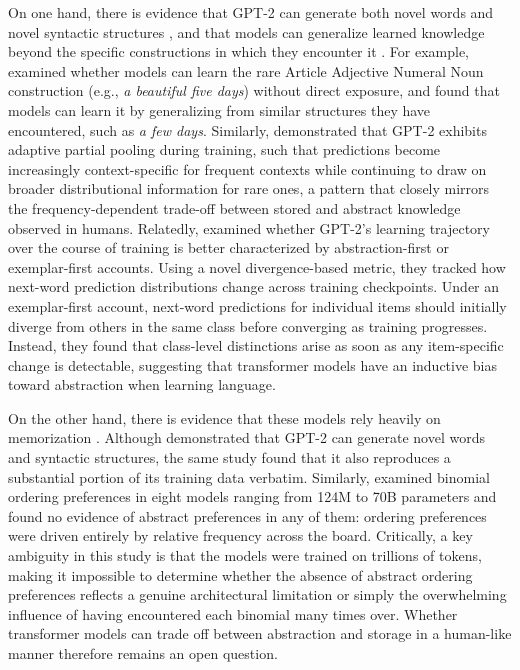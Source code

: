 \documentclass{article}
\begin{document}
On one hand, there is evidence that GPT-2
\citep{radfordLanguageModelsAre2019} can generate both novel words and
novel syntactic structures \citep{mccoy2023howmuchlanguage}, and that
models can generalize learned knowledge beyond the specific
constructions in which they encounter it
\citep{misraLanguageModelsLearn2024}. For example,
\citet{misraLanguageModelsLearn2024} examined whether models can learn
the rare Article Adjective Numeral Noun construction (e.g., \emph{a
beautiful five days}) without direct exposure, and found that models can
learn it by generalizing from similar structures they have encountered,
such as \emph{a few days}. Similarly,
\citet{kapatsinski2026transformersperformadaptive} demonstrated that
GPT-2 exhibits adaptive partial pooling during training, such that
predictions become increasingly context-specific for frequent contexts
while continuing to draw on broader distributional information for rare
ones, a pattern that closely mirrors the frequency-dependent trade-off
between stored and abstract knowledge observed in humans. Relatedly,
\citet{jian2026humans} examined whether GPT-2's learning trajectory over
the course of training is better characterized by abstraction-first or
exemplar-first accounts. Using a novel divergence-based metric, they
tracked how next-word prediction distributions change across training
checkpoints. Under an exemplar-first account, next-word predictions for
individual items should initially diverge from others in the same class
before converging as training progresses. Instead, they found that
class-level distinctions arise as soon as any item-specific change is
detectable, suggesting that transformer models have an inductive bias
toward abstraction when learning language.

On the other hand, there is evidence that these models rely heavily on
memorization
\citep{houghton2025roleabstractrepresentations, mccoy2023howmuchlanguage}.
Although \citet{mccoy2023howmuchlanguage} demonstrated that GPT-2 can
generate novel words and syntactic structures, the same study found that
it also reproduces a substantial portion of its training data verbatim.
Similarly, \citet{houghton2025roleabstractrepresentations} examined
binomial ordering preferences in eight models ranging from 124M to 70B
parameters and found no evidence of abstract preferences in any of them:
ordering preferences were driven entirely by relative frequency across
the board. Critically, a key ambiguity in this study is that the models
were trained on trillions of tokens, making it impossible to determine
whether the absence of abstract ordering preferences reflects a genuine
architectural limitation or simply the overwhelming influence of having
encountered each binomial many times over. Whether transformer models
can trade off between abstraction and storage in a human-like manner
therefore remains an open question.
\end{document}
